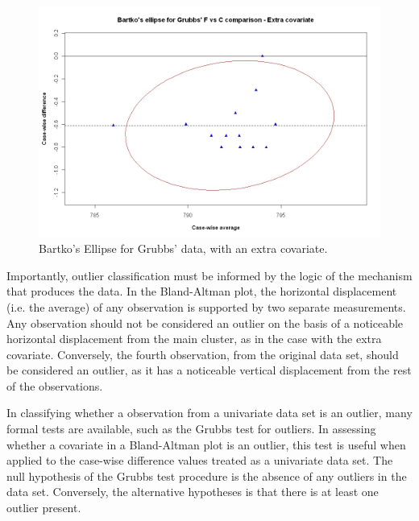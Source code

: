 \documentclass[12pt, a4paper]{report}
\theoremstyle{plain}
\theoremstyle{definition}
\theoremstyle{remark}
\begin{document}
	\begin{figure}[h!]
		\includegraphics[width=130mm]{images/GrubbsBartko2.jpeg}
		\caption{Bartko's Ellipse for Grubbs' data, with an extra covariate.}\label{GrubbsBartko2}
	\end{figure}
	
	
	Importantly, outlier classification must be informed by the logic of the
	mechanism that produces the data. In the Bland-Altman plot, the horizontal displacement (i.e. the average) of any
	observation is supported by two separate measurements. Any
	observation should not be considered an outlier on the basis of a
	noticeable horizontal displacement from the main cluster, as in
	the case with the extra covariate. Conversely, the fourth
	observation, from the original data set, should be considered an
	outlier, as it has a noticeable vertical displacement from the
	rest of the observations.
	
	
	
	In classifying whether a observation from a univariate data set is
	an outlier, many formal tests are available, such as the Grubbs test for outliers. In assessing
	whether a covariate in a Bland-Altman plot is an outlier, this
	test is useful when applied to the case-wise difference values treated as a
	univariate data set. The null hypothesis of the Grubbs test procedure is the absence
	of any outliers in the data set. Conversely, the alternative hypotheses is that there is at least one outlier
	present.
	
\end{document}
